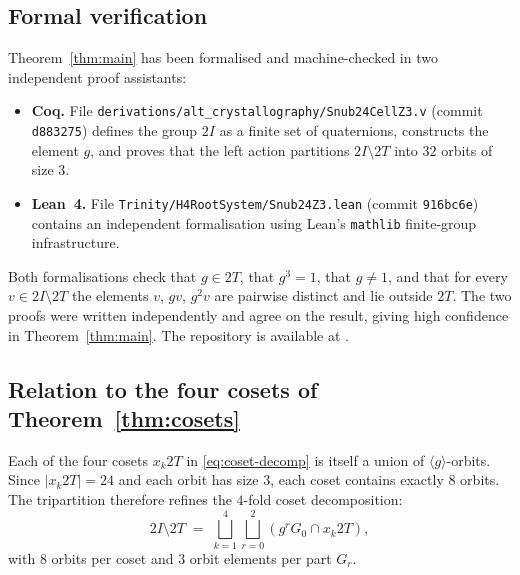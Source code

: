 \documentclass[10pt,reqno]{amsart}
\theoremstyle{plain}
\theoremstyle{definition}
\begin{document}
\subsection{Formal verification}

Theorem~\ref{thm:main} has been formalised and machine-checked in two independent proof assistants:

\begin{itemize}
\item \textbf{Coq.} File \texttt{derivations/alt\_crystallography/Snub24CellZ3.v} (commit \texttt{d883275}) defines the group $2I$ as a finite set of quaternions, constructs the element $g$, and proves that the left action partitions $2I \setminus 2T$ into $32$ orbits of size $3$.
\item \textbf{Lean~4.} File \texttt{Trinity/H4RootSystem/Snub24Z3.lean} (commit \texttt{916bc6e}) contains an independent formalisation using Lean's \texttt{mathlib} finite-group infrastructure.
\end{itemize}

Both formalisations check that $g \in 2T$, that $g^3 = 1$, that $g \neq 1$, and that for every $v \in 2I \setminus 2T$ the elements $v$, $gv$, $g^2v$ are pairwise distinct and lie outside $2T$. The two proofs were written independently and agree on the result, giving high confidence in Theorem~\ref{thm:main}. The repository is available at \cite{trinitys3ai}.

\subsection{Relation to the four cosets of Theorem~\ref{thm:cosets}}

Each of the four cosets $x_k 2T$ in \eqref{eq:coset-decomp} is itself a union of $\langle g \rangle$-orbits. Since $|x_k 2T| = 24$ and each orbit has size $3$, each coset contains exactly $8$ orbits. The tripartition therefore refines the $4$-fold coset decomposition:
\begin{equation}
2I \setminus 2T \;=\; \bigsqcup_{k=1}^{4} \bigsqcup_{r=0}^{2} (g^r G_0 \cap x_k 2T),
\end{equation}
with $8$ orbits per coset and $3$ orbit elements per part $G_r$.
\end{document}

